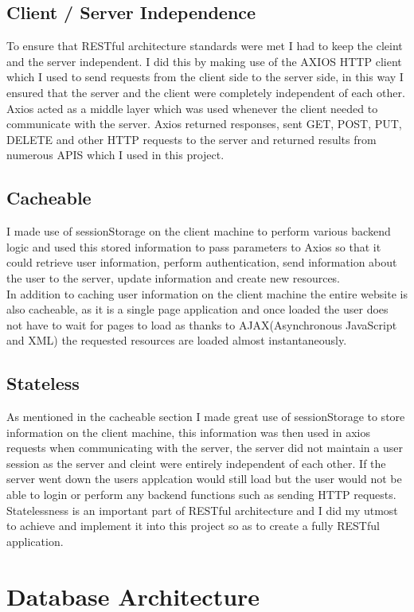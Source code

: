 \subsection{Client / Server Independence}
To ensure that RESTful architecture standards were met I had to keep the cleint
and the server independent.  I did this by making use of the AXIOS HTTP client which
I used to send requests from the client side to the server side, in this way I ensured
that the server and the client were completely independent of each other.  Axios acted
as a middle layer which was used whenever the client needed to communicate with the server.
Axios returned responses, sent GET, POST, PUT, DELETE and other HTTP requests to the server
and returned results from numerous APIS which I used in this project.
\subsection{Cacheable}
I made use of sessionStorage on the client machine to perform various backend logic and
used this stored information to pass parameters to Axios so that it could retrieve user information,
perform authentication, send information about the user to the server, update information and create new resources.
\\
In addition to caching user information on the client machine the entire website is also cacheable, as it is a single page
application and once loaded the user does not have to wait for pages to load as thanks to AJAX(Asynchronous JavaScript and XML)
the requested resources are loaded almost instantaneously.
\subsection{Stateless}
As mentioned in the cacheable section I made great use of sessionStorage to store information on the client machine, this information was then used in axios requests when communicating with the server, the server did not maintain a user session as the server and cleint were entirely independent of each other.  If the server went down the users applcation would still load but the user would not be able to login or perform any backend functions such as sending HTTP requests.  Statelessness is an important part of RESTful architecture and I did my utmost to achieve and implement it into this project so as to create a fully RESTful application.
\section{Database Architecture}
